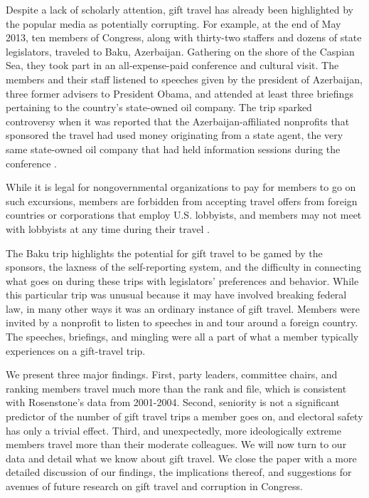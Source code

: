 \documentclass[12pt]{article}                           %
\begin{document}
Despite a lack of scholarly attention, gift travel has already been highlighted by the popular media as potentially corrupting. For example, at the end of May 2013, ten members of Congress, along with thirty-two staffers and dozens of state legislators, traveled to Baku, Azerbaijan. Gathering on the shore of the Caspian Sea, they took part in an all-expense-paid conference and cultural visit. The members and their staff listened to speeches given by the president of Azerbaijan, three former advisers to President Obama, and attended at least three briefings pertaining to the country's state-owned oil company. The trip sparked controversy when it was reported that the Azerbaijan-affiliated nonprofits that sponsored the travel had used money originating from a state agent, the very same state-owned oil company that had held information sessions during the conference \citep{Tucker2014}.

While it is legal for nongovernmental organizations to pay for members to go on such excursions, members are forbidden from accepting travel offers from foreign countries or corporations that employ U.S. lobbyists, and members may not meet with lobbyists at any time during their travel \citep{Wickham2015}.

The Baku trip highlights the potential for gift travel to be gamed by the sponsors, the laxness of the self-reporting system, and the difficulty in connecting what goes on during these trips with legislators' preferences and behavior. While this particular trip was unusual because it may have involved breaking federal law, in many other ways it was an ordinary instance of gift travel. Members were invited by a nonprofit to listen to speeches in and tour around a foreign country. The speeches, briefings, and mingling were all a part of what a member typically experiences on a gift-travel trip.

We present three major findings. First, party leaders, committee chairs, and ranking members travel much more than the rank and file, which is consistent with Rosenstone's data from 2001-2004. Second, seniority is not a significant predictor of the number of gift travel trips a member goes on, and electoral safety has only a trivial effect. Third, and unexpectedly, more ideologically extreme members travel more than their moderate colleagues. We will now turn to our data and detail what we know about gift travel. We close the paper with a more detailed discussion of our findings, the implications thereof, and suggestions for avenues of future research on gift travel and corruption in Congress.
\end{document}
